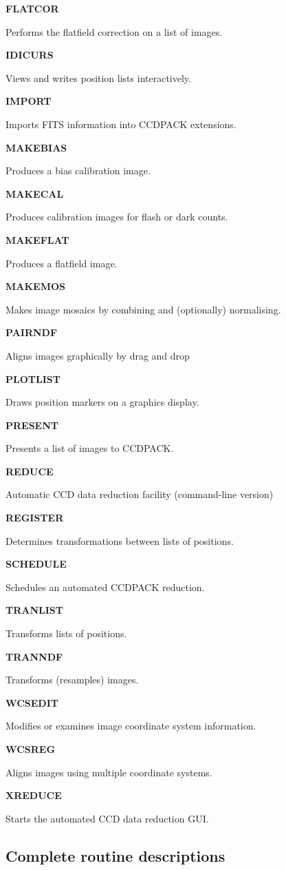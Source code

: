 \documentclass[twoside,11pt]{article}
\newenvironment{latexonly}{}{}
\renewcommand{\_}{\texttt{\symbol{95}}}
\newcommand{\quickdes}[3]{
                         \parbox{1.1in}{\bf #1}
                         \parbox{4.4in}{\raggedright #2 \dotfill}
                         \parbox{0.6in}{\pageref{#3}}
                         \vspace*{0.2in}}
\begin{document}
\begin{latexonly}
\quickdes{FLATCOR}{Performs the flatfield correction on a list of images.}
                  {FLATCOR}

\quickdes{IDICURS}{Views and writes position lists interactively.}{IDICURS}

\quickdes{IMPORT}{Imports FITS information into CCDPACK extensions.}{IMPORT}

\quickdes{MAKEBIAS}{Produces a bias calibration image.}{MAKEBIAS}

\quickdes{MAKECAL}{Produces calibration images for flash or dark counts.}
                  {MAKECAL}

\quickdes{MAKEFLAT}{Produces a flatfield image.}
                   {MAKEFLAT}

\quickdes{MAKEMOS}{Makes image mosaics by combining and (optionally) 
                   normalising.}
                  {MAKEMOS}

\quickdes{PAIRNDF}{Aligns images graphically by drag and drop}{PAIRNDF}

\quickdes{PLOTLIST}{Draws position markers on a graphics display.}
                   {PLOTLIST}

\quickdes{PRESENT}{Presents a list of images to CCDPACK.}{PRESENT}

\quickdes{REDUCE}{Automatic CCD data reduction facility (command-line version)}
                 {REDUCE}

\quickdes{REGISTER}{Determines transformations between lists of positions.}
                   {REGISTER}

\quickdes{SCHEDULE}{Schedules an automated CCDPACK reduction.}{SCHEDULE}

\quickdes{TRANLIST}{Transforms lists of positions.}
                   {TRANLIST}

\quickdes{TRANNDF}{Transforms (resamples) images.} {TRANNDF}

\quickdes{WCSEDIT}{Modifies or examines image coordinate system information.}
                  {WCSEDIT}

\quickdes{WCSREG}{Aligns images using multiple coordinate systems.}{WCSREG}

\quickdes{XREDUCE}{Starts the automated CCD data reduction GUI.}{XREDUCE}
\end{latexonly}

\subsection{Complete routine descriptions \label{descriptions}}
\end{document}
